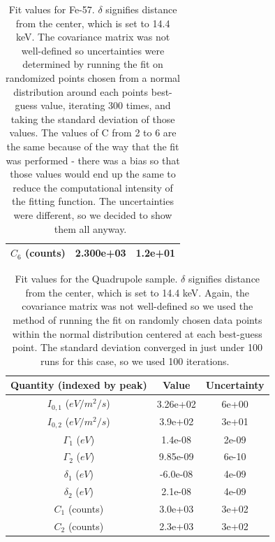 \documentclass[reprint, nobibnotes, amssymb, amsmath, amsfonts, mathtools, mathrsfs, floatfix]{revtex4-1}
\begin{document}
\begin{table}[h]
\begin{tabular}{|c|c|c|}
           $C_6$ (counts) & 2.300e+03 & 1.2e+01 \\ \hline
        \end{tabular}
        \caption{Fit values for Fe-57.  $\delta$ signifies distance from the center, which is set to 14.4 keV.  The covariance matrix was not well-defined so uncertainties were determined by running the fit on randomized points chosen from a normal distribution around each points best-guess value, iterating 300 times, and taking the standard deviation of those values.  The values of C from 2 to 6 are the same because of the way that the fit was performed - there was a bias so that those values would end up the same to reduce the computational intensity of the fitting function.  The uncertainties were different, so we decided to show them all anyway.~\label{tab:fe_57_fit}}
      \end{table}

      \begin{table}[h]
        \begin{tabular}{|c|c|c|}
          \hline
          Quantity (indexed by peak) & Value & Uncertainty \\ \hline \hline
          $I_{0, 1}$ ($eV/m^2/s$) & 3.26e+02 & 6e+00 \\ \hline
          $I_{0, 2}$ ($eV/m^2/s$)& 3.9e+02 & 3e+01 \\ \hline \hline
          $\Gamma_1$ ($eV$) & 1.4e-08 & 2e-09 \\ \hline
          $\Gamma_2$ ($eV$) & 9.85e-09 & 6e-10 \\ \hline \hline
          $\delta_{1}$ ($eV$) & -6.0e-08 & 4e-09 \\ \hline
          $\delta_{2}$ ($eV$) & 2.1e-08 & 4e-09 \\ \hline \hline
          $C_1$ (counts) & 3.0e+03 & 3e+02 \\ \hline
          $C_2$ (counts) & 2.3e+03 & 3e+02 \\ \hline
        \end{tabular}
        \caption{Fit values for the Quadrupole sample.  $\delta$ signifies distance from the center, which is set to 14.4 keV.  Again, the covariance matrix was not well-defined so we used the method of running the fit on randomly chosen data points within the normal distribution centered at each best-guess point.  The standard deviation converged in just under 100 runs for this case, so we used 100 iterations.~\label{tab:quad_fit}}
      \end{table}
      
\end{document}
